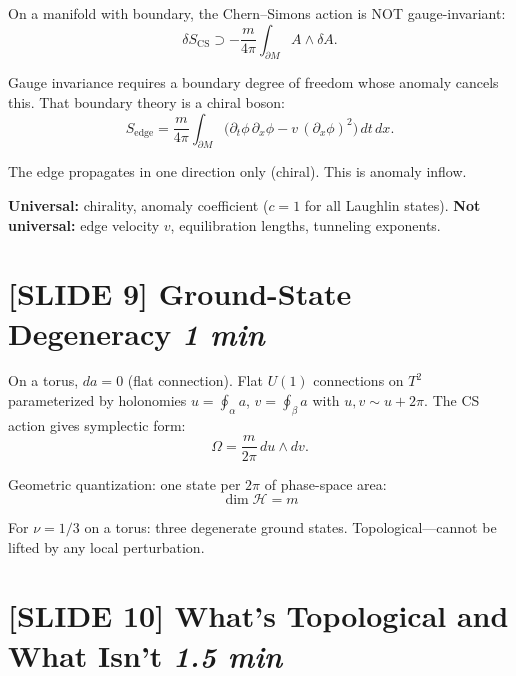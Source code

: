 \documentclass[11pt]{article}
\begin{document}
On a manifold with boundary, the Chern--Simons action is NOT gauge-invariant:
\begin{equation}
\delta S_{\mathrm{CS}} \supset -\frac{m}{4\pi}\int_{\partial M} A \wedge \delta A.
\end{equation}

Gauge invariance requires a boundary degree of freedom whose anomaly cancels this. That boundary theory is a chiral boson:
\begin{equation}
S_{\mathrm{edge}} = \frac{m}{4\pi}\int_{\partial M}\bigl(\partial_t\phi\,\partial_x\phi - v\,(\partial_x\phi)^2\bigr)\,dt\,dx.
\end{equation}

The edge propagates in one direction only (chiral). This is anomaly inflow.

\textbf{Universal:} chirality, anomaly coefficient ($c=1$ for all Laughlin states). \textbf{Not universal:} edge velocity $v$, equilibration lengths, tunneling exponents.

\section{[SLIDE 9] Ground-State Degeneracy \hfill \normalfont\textit{1 min}}

On a torus, $da = 0$ (flat connection). Flat $U(1)$ connections on $T^2$ parameterized by holonomies $u = \oint_\alpha a$, $v = \oint_\beta a$ with $u,v \sim u+2\pi$. The CS action gives symplectic form:
\begin{equation}
\Omega = \frac{m}{2\pi}\,du \wedge dv.
\end{equation}

Geometric quantization: one state per $2\pi$ of phase-space area:
\begin{equation}
\boxed{\dim\mathcal{H} = m}
\end{equation}

For $\nu = 1/3$ on a torus: three degenerate ground states. Topological---cannot be lifted by any local perturbation.

\section{[SLIDE 10] What's Topological and What Isn't \hfill \normalfont\textit{1.5 min}}
\end{document}
